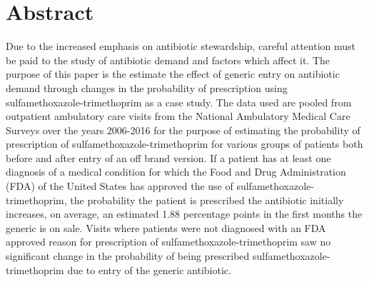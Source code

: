\chapter*{Abstract} %
Due to the increased emphasis on antibiotic stewardship, careful attention must be paid to the study of antibiotic demand and factors which affect it. The purpose of this paper is the estimate the effect of generic entry on antibiotic demand through changes in the probability of prescription using sulfamethoxazole-trimethoprim as a case study. The data used are pooled from outpatient ambulatory care visits from the National Ambulatory Medical Care Surveys over the years 2006-2016 for the purpose of estimating the probability of prescription of sulfamethoxazole-trimethoprim for various groups of patients both before and after entry of an off brand version. If a patient has at least one diagnosis of a medical condition for which the Food and Drug Administration (FDA) of the United States has approved the use of sulfamethoxazole-trimethoprim, the probability the patient is prescribed the antibiotic initially increases, on average, an estimated 1.88 percentage points in the first months the generic is on sale. Visits where patients were not diagnosed with an FDA approved reason for prescription of sulfamethoxazole-trimethoprim saw no significant change in the probability of being prescribed sulfamethoxazole-trimethoprim due to entry of the generic antibiotic.
